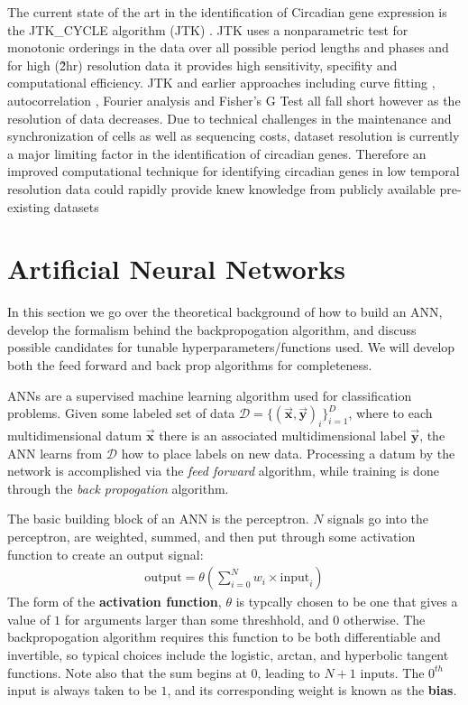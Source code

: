 \documentclass[prl,amsmath,amssymb,floatfix,superscriptaddress,notitlepage,twocolumn]{revtex4}
\newcommand{\ee}[1]{\begin{align} #1 \end{align}} 						%
\newcommand{\vc}[1]{\vec{\mathbf{#1}}} 								%
\begin{document}
The current state of the art in the identification of Circadian gene expression is the JTK\_CYCLE algorithm (JTK) \cite{Hughes10}.  JTK uses a nonparametric test for monotonic orderings in the data over all possible period lengths and phases and for high (\~2hr) resolution data it provides high sensitivity, specifity and computational efficiency.  JTK and earlier approaches including curve fitting \cite{Straume04}, autocorrelation \cite{Levine02}, Fourier analysis \cite{Wichert04,Whitfield04} and Fisher's G Test \cite{Wichert04} all fall short however as the resolution of data decreases.  Due to technical challenges in the maintenance and synchronization of cells as well as sequencing costs, dataset resolution is currently a major limiting factor in the identification of circadian genes.  Therefore an improved computational technique for identifying circadian genes in low temporal resolution data could rapidly provide knew knowledge from publicly available pre-existing datasets

\section{Artificial Neural Networks}
In this section we go over the theoretical background of how to build an ANN, develop the formalism behind the backpropogation algorithm, and discuss possible candidates for tunable hyperparameters/functions used. We will develop both the feed forward and back prop algorithms for completeness. 

ANNs are a supervised machine learning algorithm used for classification problems. Given some labeled set of data $\mathcal{D}=\{(\vc x,\vc y)_i\}_{i=1}^D$, where to each multidimensional datum $\vc x$ there is an associated multidimensional label $\vc y$, the ANN learns from $\mathcal{D}$ how to place labels on new data. Processing a datum by the network is accomplished via the \textit{feed forward} algorithm, while training is done through the \textit{back propogation} algorithm. 

The basic building block of an ANN is the perceptron. $N$ signals go into the perceptron, are weighted, summed, and then put through some activation function to create an output signal:
\ee{
\label{perceptron}
\text{output}=\theta(\sum_{i=0}^{N}w_i\times\text{input}_i)
}
The form of the \textbf{activation function}, $\theta$ is typcally chosen to be one that gives a value of $1$ for arguments larger than some threshhold, and $0$ otherwise. The backpropogation algorithm requires this function to be both differentiable and invertible, so typical choices include the logistic, arctan, and hyperbolic tangent functions. Note also that the sum begins at $0$, leading to $N+1$ inputs. The $0^{th}$ input is always taken to be $1$, and its corresponding weight is known as the \textbf{bias}.
\end{document}
